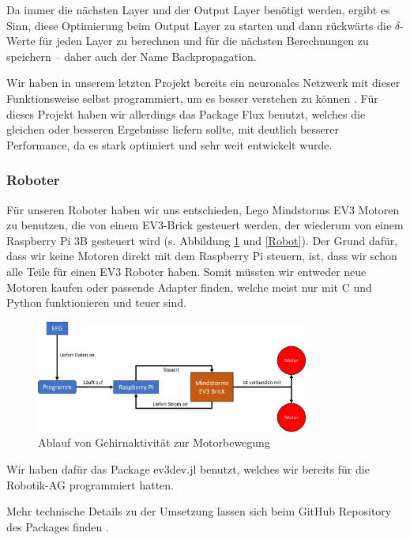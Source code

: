 \documentclass{scrartcl}
\begin{document}
	Da immer die nächsten Layer und der Output Layer benötigt werden, ergibt es Sinn, diese Optimierung beim Output Layer zu starten und dann rückwärts die \mbox{$\delta$-Werte} für jeden Layer zu berechnen und für die nächsten Berechnungen zu speichern -- daher auch der Name Backpropagation. \cite{MITNeuronale} \cite{3b1b:fft} \cite{brotcrunsher:backwardpass}


	Wir haben in unserem letzten Projekt bereits ein neuronales Netzwerk mit dieser Funktionsweise selbst programmiert, um es besser verstehen zu können \cite{AIComposer}. Für dieses Projekt haben wir allerdings das Package Flux benutzt, welches die gleichen oder besseren Ergebnisse liefern sollte, mit deutlich besserer Performance, da es stark optimiert und sehr weit entwickelt wurde.

	\subsubsection{Roboter}

	Für unseren Roboter haben wir uns entschieden, Lego Mindstorms EV3 Motoren zu benutzen, die von einem EV3-Brick gesteuert werden, der wiederum von einem Raspberry Pi 3B gesteuert wird (s. Abbildung \ref{robot-funktion} und \ref{Robot}). Der Grund dafür, dass wir keine Motoren direkt mit dem Raspberry Pi steuern, ist, dass wir schon alle Teile für einen EV3 Roboter haben. Somit müssten wir entweder neue Motoren kaufen oder passende Adapter finden, welche meist nur mit C und Python funktionieren und teuer sind.

	\begin{figure}[h!]
		\centering
		\includegraphics[width=0.8\textwidth]{pictures/roboter-funktionsweise.png}
		\caption{Ablauf von Gehirnaktivität zur Motorbewegung}
		\label{robot-funktion}
	\end{figure}

	Wir haben dafür das Package ev3dev.jl benutzt, welches wir bereits für die Robotik-AG programmiert hatten.

	Mehr technische Details zu der Umsetzung lassen sich beim GitHub Repository des Packages finden \cite{ev3dev}.
\end{document}
